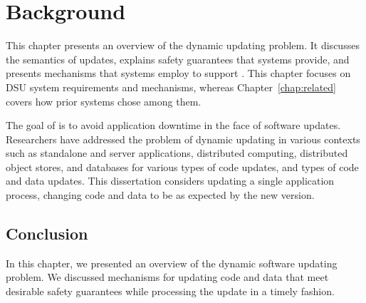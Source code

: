 \chapter{Background\label{chap:dsu}}


This chapter presents an overview of the dynamic updating problem.
It discusses the semantics of
updates, explains safety guarantees that \USD systems provide, and presents
mechanisms that systems employ to support \USD. This chapter focuses on DSU
system requirements and mechanisms, whereas Chapter~\ref{chap:related}
covers how prior systems chose among them.

The goal of \USD is to avoid application downtime in the face of software
updates. Researchers have addressed the problem of dynamic updating in
various contexts such as standalone and server applications, distributed
computing, distributed object stores, and databases for various types of
code updates, and types of code and data updates. This dissertation
considers updating a single application process, changing code and data to
be as expected by the new version.






\section{Conclusion}
In this chapter, we presented an overview of the dynamic software updating
problem.  We discussed mechanisms for updating code and data that meet
desirable safety guarantees while processing the update in a timely
fashion.
